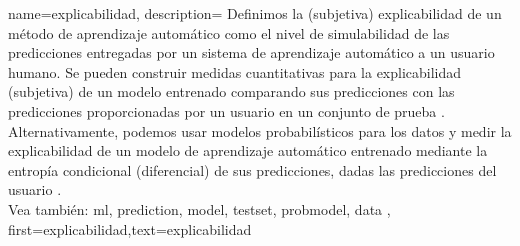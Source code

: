 {name={explicabilidad},
	description={
		Definimos la (subjetiva) explicabilidad de un método de aprendizaje automático
		como el nivel de simulabilidad \cite{Colin:2022aa} de las predicciones
		entregadas por un sistema de aprendizaje automático a un usuario humano.
		Se pueden construir medidas cuantitativas para la explicabilidad (subjetiva) de un modelo entrenado
		comparando sus predicciones con las predicciones proporcionadas por un usuario
		en un conjunto de prueba \cite{Zhang:2024aa,Colin:2022aa}.
		Alternativamente, podemos usar modelos probabilísticos para los datos
		y medir la explicabilidad de un modelo de aprendizaje automático entrenado mediante la entropía condicional
		(diferencial) de sus predicciones, dadas las predicciones del usuario \cite{JunXML2020,Chen2018}.
		\\
		Vea también: \gls{ml}, \gls{prediction}, \gls{model}, \gls{testset}, \gls{probmodel}, \gls{data} },
	first={explicabilidad},text={explicabilidad}
}
	
